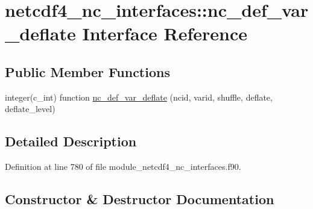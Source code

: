 \hypertarget{interfacenetcdf4__nc__interfaces_1_1nc__def__var__deflate}{}\section{netcdf4\+\_\+nc\+\_\+interfaces\+:\+:nc\+\_\+def\+\_\+var\+\_\+deflate Interface Reference}
\label{interfacenetcdf4__nc__interfaces_1_1nc__def__var__deflate}
\subsection*{Public Member Functions}
\begin{DoxyCompactItemize}
\item 
integer(c\+\_\+int) function \hyperlink{interfacenetcdf4__nc__interfaces_1_1nc__def__var__deflate_ac1b59fa214b4a3d77ff562ec8ab968ab}{nc\+\_\+def\+\_\+var\+\_\+deflate} (ncid, varid, shuffle, deflate, deflate\+\_\+level)
\end{DoxyCompactItemize}


\subsection{Detailed Description}


Definition at line 780 of file module\+\_\+netcdf4\+\_\+nc\+\_\+interfaces.\+f90.



\subsection{Constructor \& Destructor Documentation}
\mbox{\label{interfacenetcdf4__nc__interfaces_1_1nc__def__var__deflate_ac1b59fa214b4a3d77ff562ec8ab968ab}} 
